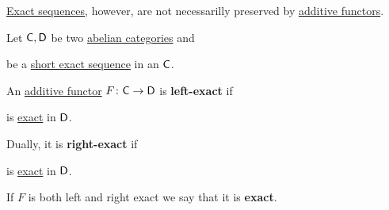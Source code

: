 \documentclass[../../main]{subfiles}
\begin{document}
\hyperref[def:exact-sequence]{Exact sequences}, however, are not necessarilly preserved by \hyperref[def:additive-functor]{additive functors}.
\begin{definition}\label{def:exact-functor}
  Let \(\mathsf{C}, \mathsf{D}\) be two \hyperref[def:abelian-category]{abelian categories} and
  \begin{center}
  \end{center}
  be a \hyperref[def:exact-sequence]{short exact sequence} in an \(\mathsf{C}\).
  
  An \hyperref[def:additive-functor]{additive functor} \(F\colon \mathsf{C} \to \mathsf{D}\) is \textbf{left-exact} if
   \begin{center}
  \end{center}
  is \hyperref[def:exact-sequence]{exact} in \(\mathsf{D}\).

  Dually, it is \textbf{right-exact} if
   \begin{center}
  \end{center}
  is \hyperref[def:exact-sequence]{exact} in \(\mathsf{D}\).

  If \(F\) is both left and right exact we say that it is \textbf{exact}.
\end{definition}
\end{document}
